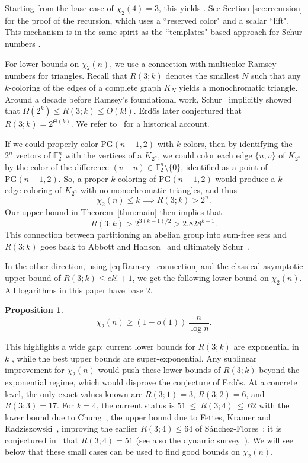 \documentclass[11pt]{article}
\theoremstyle{plain}
\newtheorem{proposition}{Proposition}
\newcommand{\F}{\mathbb{F}}
\newcommand{\PG}{\mathrm{PG}}
\begin{document}
Starting from the base case of $\chi_2(4)=3$, this yields .
See Section \ref{sec:recursion} for the proof of the recursion, which uses a ``reserved color" and a scalar ``lift". 
This mechanism is in the same spirit as the ``templates"-based approach for Schur numbers \cite{Rowley2021,Ageron2021}.

For lower bounds on $\chi_2(n)$, we use a connection with multicolor Ramsey numbers for triangles. 
Recall that $R(3;k)$ denotes the smallest $N$ such that any $k$-coloring of the edges of a complete graph $K_N$ yields a monochromatic triangle. 
Around a decade before Ramsey's foundational work, Schur~\cite{Schur1917} implicitly showed that 
$\Omega(2^k)\le R(3;k)\le O(k!)$. 
Erd\H{o}s later conjectured that $R(3;k)=2^{\Theta(k)}$.
We refer to~\cite{NR01} for a historical account.

If we could properly color $\PG(n-1,2)$ with $k$ colors, then by identifying the $2^n$ vectors of $\F_2^n$ with the vertices of a $K_{2^n}$, we could color each edge $\{u,v\}$ of $K_{2^n}$ by the color of the difference $(v-u) \in \F_2^n \setminus \{0\}$, identified as a point of $\PG(n -1, 2)$.
So, a proper $k$-coloring of $\PG(n-1,2)$ would produce a $k$-edge-coloring of $K_{2^n}$ with no monochromatic triangles, and thus
\begin{equation}\label{eq:Ramsey_connection}
\chi_2(n)\leq k \implies R(3;k) > 2^n.
\end{equation}
Our upper bound in Theorem~\ref{thm:main} then implies that
\begin{equation}\label{eq:our-r3k-lowerbound}
R(3;k) > 2^{3(k-1)/2} > 2.828^{k-1}.
\end{equation}
This connection between partitioning an abelian group into sum-free sets and $R(3;k)$ goes back to Abbott and Hanson~\cite{AbbottHanson1972} and ultimately Schur~\cite{Schur1917}.

In the other direction, using \cref{eq:Ramsey_connection} and the classical asymptotic upper bound \cite{GreenwoodGleason1955} of $R(3;k) \leq e k! + 1$, we get the following lower bound on $\chi_2(n)$. All logarithms in this paper have base $2$.
\begin{proposition}\label{prop:chin-lower}
\[
\chi_2(n) \ge (1 - o(1))\,\frac{n}{\log n}.
\]

\end{proposition}
This highlights a wide gap: current lower bounds for $R(3;k)$ are exponential in $k$ \cite{Rowley2021,Ageron2021}, while the best upper bounds are super-exponential. 
Any sublinear improvement for $\chi_2(n)$ would push these lower bounds of $R(3;k)$ beyond the exponential regime, which would disprove the conjecture of Erd\H{o}s. 
At a concrete level, the only exact values known are $R(3;1)=3$, $R(3;2)=6$, and $R(3;3)=17$. For $k=4$, the current status is $51 \ \le\ R(3;4) \ \le\ 62$ with the lower bound due to Chung~\cite{Chung1973}, the upper bound due to Fettes, Kramer and Radziszowski~\cite{FettesKramerRadziszowski2004}, improving the earlier $R(3;4)\le 64$ of S\'anchez-Flores~\cite{SanchezFlores1995}; it is conjectured in~\cite{XuRadziszowski2016} that $R(3;4)=51$ (see also the dynamic survey~\cite{RadziszowskiSurvey2017}).
We will see below that these small cases can be used to find good bounds on $\chi_2(n)$.
\end{document}
